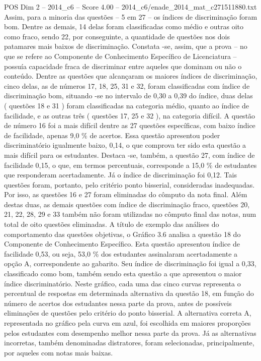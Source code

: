 \begin{textsample}{POS Dim 2 – 2014\_c6 – Score 4.00 – 2014\_c6/enade\_2014\_mat\_c271511880.txt}
Assim, para a minoria das questões – 5 em 27 – os índices de discriminação foram bom.
Dentre as demais, 14 delas foram classificadas como médio e outras oito como fraco, sendo 22, por conseguinte, a quantidade de questões nos dois patamares mais baixos de discriminação.
Constata -se, assim, que a prova – no que se refere ao Componente de Conhecimento Específico de Licenciatura – possuía capacidade fraca de discriminar entre aqueles que dominam ou não o conteúdo.
Dentre as questões que alcançaram os maiores índices de discriminação, cinco delas, as de números 17, 18, 25, 31 e 32, foram classificadas com índice de discriminação bom, situando -se no intervalo de 0,30 a 0,39 do índice, duas delas ( questões 18 e 31 ) foram classificadas na categoria médio, quanto ao índice de facilidade, e as outras três ( questões 17, 25 e 32 ), na categoria difícil.
A questão de número 16 foi a mais difícil dentre as 27 questões específicas, com baixo índice de facilidade, apenas 9,0 \% de acertos.
Essa questão apresentou poder discriminatório igualmente baixo, 0,14, o que comprova ter sido esta questão a mais difícil para os estudantes.
Destaca -se, também, a questão 27, com índice de facilidade 0,15, o que, em termos percentuais, corresponde a 15,0 \% de estudantes que responderam acertadamente.
Já o índice de discriminação foi 0,12.
Tais questões foram, portanto, pelo critério ponto bisserial, consideradas inadequadas.
Por isso, as questões 16 e 27 foram eliminadas do cômputo da nota final.
Além destas duas, as demais questões com índice de discriminação fraco, questões 20, 21, 22, 28, 29 e 33 também não foram utilizadas no cômputo final das notas, num total de oito questões eliminadas.
A título de exemplo das análises do comportamento das questões objetivas, o Gráfico 3.6 analisa a questão 18 do Componente de Conhecimento Específico.
Esta questão apresentou índice de facilidade 0,53, ou seja, 53,0 \% dos estudantes assinalaram acertadamente a opção A, correspondente ao gabarito.
Seu índice de discriminação foi igual a 0,33, classificado como bom, também sendo esta questão a que apresentou o maior índice discriminatório.
Neste gráfico, cada uma das cinco curvas representa o percentual de respostas em determinada alternativa da questão 18, em função do número de acertos dos estudantes nessa parte da prova, antes de possíveis eliminações de questões pelo critério do ponto bisserial.
A alternativa correta A, representada no gráfico pela curva em azul, foi escolhida em maiores proporções pelos estudantes com desempenho melhor nessa parte da prova.
Já as alternativas incorretas, também denominadas distratores, foram selecionadas, principalmente, por aqueles com notas mais baixas.

\end{textsample}
